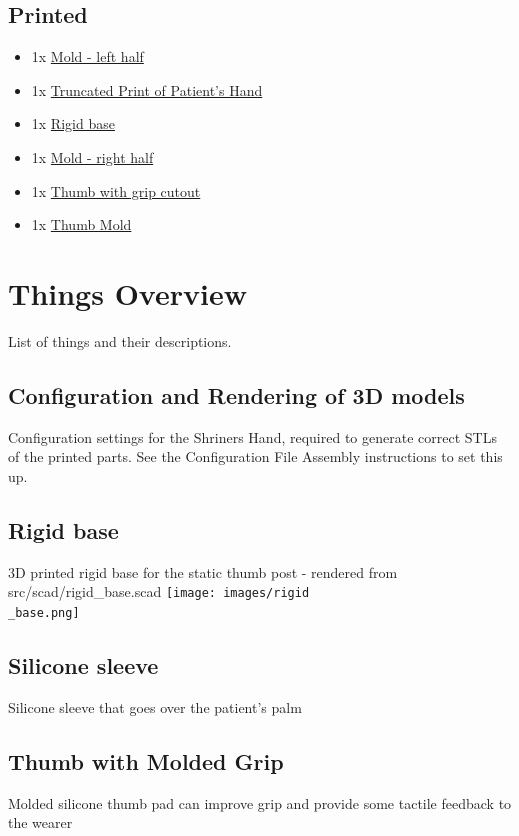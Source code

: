 \documentclass[11pt]{article}
\begin{document}
\subsection{Printed}
\begin{itemize}
\item 1x \hyperlink{thing_mold\_left\_half}{Mold - left half}
\item 1x \hyperlink{thing_truncated\_hand}{Truncated Print of Patient's Hand}
\item 1x \hyperlink{thing_rigid\_base}{Rigid base}
\item 1x \hyperlink{thing_mold\_right\_half}{Mold - right half}
\item 1x \hyperlink{thing_thumb\_with\_grip\_cutout}{Thumb with grip cutout}
\item 1x \hyperlink{thing_thumb\_mold}{Thumb Mold}
\end{itemize}

\newpage

\section{Things Overview}
List of things and their descriptions.

\hypertarget{thing_config\_file}{\subsection{Configuration and Rendering of 3D models}}
Configuration settings for the Shriners Hand, required to generate correct STLs of the printed parts. See the Configuration File Assembly instructions to set this up.

\hypertarget{thing_rigid\_base}{\subsection{Rigid base}}
3D printed rigid base for the static thumb post - rendered from src/scad/rigid_base.scad
\texttt{[image: images/rigid\\\_base.png]}

\hypertarget{thing_silicone\_sleeve}{\subsection{Silicone sleeve}}
Silicone sleeve that goes over the patient's palm

\hypertarget{thing_molded\_thumb}{\subsection{Thumb with Molded Grip}}
Molded silicone thumb pad can improve grip and provide some tactile feedback to the wearer
\end{document}

